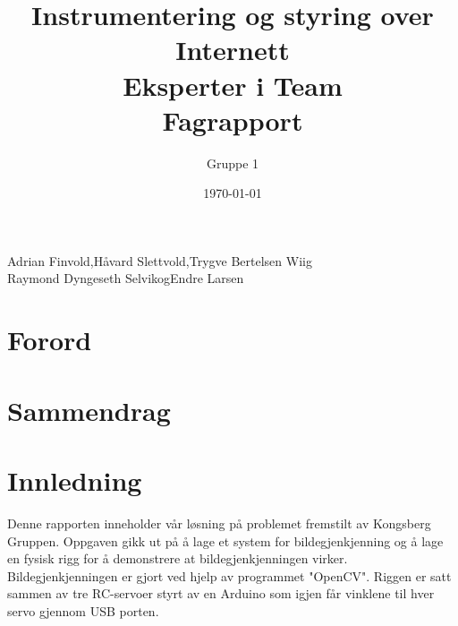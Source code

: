 \documentclass[a4paper, 11pt]{article}
\title{Instrumentering og styring over Internett\\Eksperter i Team\\Fagrapport}
\author{Gruppe 1}
\date{\today}
\newcommand{\HS}{Håvard Slettvold}
\newcommand{\AF}{Adrian Finvold}
\newcommand{\TW}{Trygve Bertelsen Wiig}
\newcommand{\RS}{Raymond Dyngeseth Selvik}
\newcommand{\EL}{Endre Larsen}
\begin{document}
 

\thispagestyle{fancy} %

\maketitle 

\vspace*{\fill}
\begin{center}
\AF,\hspace{0.1cm}\HS,\hspace{0.1cm}\TW \\
\RS\hspace{0.1cm}og\hspace{0.1cm}\EL
\end{center}

\clearpage

 \newpage
\section*{Forord}

 \newpage
\section*{Sammendrag}


 \newpage

 \tableofcontents
\newpage


 \newpage
\section{Innledning}
Denne rapporten inneholder vår løsning på problemet fremstilt av Kongsberg Gruppen. Oppgaven gikk ut på å lage et system for bildegjenkjenning og å lage en fysisk rigg for å demonstrere at bildegjenkjenningen virker. Bildegjenkjenningen er gjort ved hjelp av programmet "OpenCV". Riggen er satt sammen av tre RC-servoer styrt av en Arduino som igjen får vinklene til hver servo gjennom USB porten.
\end{document}
